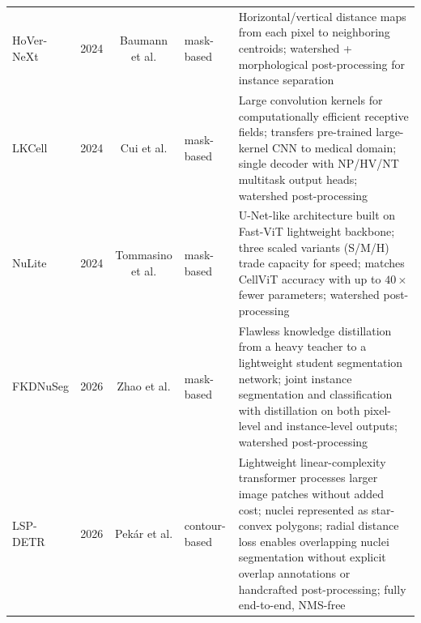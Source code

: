 \begin{longtable}{l c c l >{\footnotesize}p{}}
		HoVer-NeXt \cite{baumann2024hovernext, graham2019hover}
			& 2024 & Baumann et al.
			& mask-based
			& Horizontal/vertical distance maps from each pixel to neighboring centroids; watershed + morphological post-processing for instance separation \\
		LKCell \cite{cui2024lkcell}
			& 2024 & Cui et al.
			& mask-based
			& Large convolution kernels for computationally efficient receptive fields; transfers pre-trained large-kernel CNN to medical domain; single decoder with NP/HV/NT multitask output heads; watershed post-processing \\
		NuLite \cite{tommasino2024nulite}
			& 2024 & Tommasino et al.
			& mask-based
			& U-Net-like architecture built on Fast-ViT lightweight backbone; three scaled variants (S/M/H) trade capacity for speed; matches CellViT accuracy with up to $40\times$ fewer parameters; watershed post-processing \\
		FKDNuSeg \cite{zhao2026fkdnuseg}
			& 2026 & Zhao et al.
			& mask-based
			& Flawless knowledge distillation from a heavy teacher to a lightweight student segmentation network; joint instance segmentation and classification with distillation on both pixel-level and instance-level outputs; watershed post-processing \\
		LSP-DETR \cite{pekar2026lspdetr}
			& 2026 & Pekár et al.
			& contour-based
			& Lightweight linear-complexity transformer processes larger image patches without added cost; nuclei represented as star-convex polygons; radial distance loss enables overlapping nuclei segmentation without explicit overlap annotations or handcrafted post-processing; fully end-to-end, NMS-free \\
		\hline
\end{longtable}
